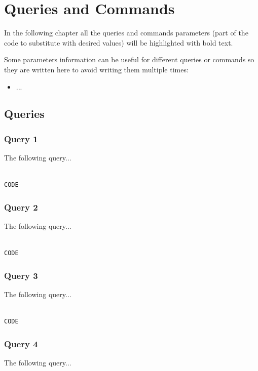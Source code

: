 \documentclass{article}
\begin{document}
\newpage
\section{Queries and Commands}
In the following chapter all the queries and commands parameters (part of the code to substitute with desired values) will be highlighted with \textbf{\color{magenta}{magenta}} bold text.

Some parameters information can be useful for different queries or commands so they are written here to avoid writing them multiple times:
\begin{itemize}
    \item ...
\end{itemize}
\subsection{Queries}
\subsubsection{Query 1}
The following query...

\begin{lstlisting}[language=cypher, label=lst:cypher-example]

CODE

\end{lstlisting}
\subsubsection{Query 2}
The following query...

\begin{lstlisting}[language=cypher, label=lst:cypher-example]

CODE

\end{lstlisting}
\subsubsection{Query 3}
The following query...

\begin{lstlisting}[language=cypher, label=lst:cypher-example]

CODE

\end{lstlisting}
\subsubsection{Query 4}
The following query...
\end{document}
